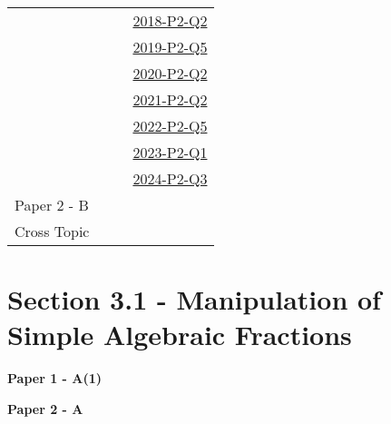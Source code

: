 \documentclass[12pt, a4paper]{article}
\begin{document}
\begin{absolutelynopagebreak}
\begin{center}
\begin{tabular}{|l|c|c|c|}
&  &  & \hyperref[DSE2018-CoreP2-Q02]{2018-P2-Q2} \\
&  &  & \hyperref[DSE2019-CoreP2-Q05]{2019-P2-Q5} \\
&  &  & \hyperref[DSE2020-CoreP2-Q02]{2020-P2-Q2} \\
&  &  & \hyperref[DSE2021-CoreP2-Q02]{2021-P2-Q2} \\
&  &  & \hyperref[DSE2022-CoreP2-Q05]{2022-P2-Q5} \\
&  &  & \hyperref[DSE2023-CoreP2-Q01]{2023-P2-Q1} \\
&  &  & \hyperref[DSE2024-CoreP2-Q03]{2024-P2-Q3} \\
\hline
Paper 2 - B&  &  &  \\
\hline
\hline
Cross Topic&  &  &  \\
\hline
\end{tabular}
\end{center}
\end{absolutelynopagebreak}




\section*{Section 3.1 - Manipulation of Simple Algebraic Fractions}\label{section:2-3-1}

\textbf{Paper 1 - A(1)}
\begin{enumx}[label=\arabic*.,start=1]
\item {}\label{DSE2016-CoreP1-Q03} 
\item {}\label{DSE2019-CoreP1-Q02} 
\item {}\label{DSE2022-CoreP1-Q03} 
\item {}\label{DSE2024-CoreP1-Q01} 
\end{enumx}
\textbf{Paper 2 - A}
\begin{enumx}[label=\arabic*.,start=5]
\item {}\label{DSE2018-CoreP2-Q04} 
\item {}\label{DSE2020-CoreP2-Q03} 
\item {}\label{DSE2021-CoreP2-Q04} 
\item {}\label{DSE2023-CoreP2-Q02} 
\end{enumx}
\end{document}
